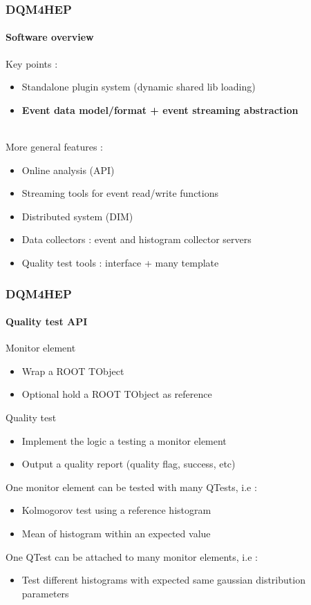\documentclass[presentation, 10pt]{beamer}
\begin{document}
\begin{frame}
  \frametitle{DQM4HEP}
  \framesubtitle{Software overview}
  \footnotesize
  Key points : 
  \begin{itemize}
    \item Standalone plugin system (dynamic shared lib loading) 
    \item \textbf{Event data model/format + event streaming abstraction}
  \end{itemize}
  ~ \\
  More general features :
  \begin{itemize}
    \item Online analysis (API)
    \item Streaming tools for event read/write functions
    \item Distributed system (DIM)
    \item Data collectors : event and histogram collector servers
    \item Quality test tools : interface + many template
  \end{itemize}
\end{frame}


\begin{frame}
  \frametitle{DQM4HEP}
  \framesubtitle{Quality test API}
  \footnotesize
  \begin{block}{Monitor element}
    \begin{itemize}
      \item Wrap a ROOT TObject 
      \item Optional hold a ROOT TObject as reference
    \end{itemize}
  \end{block}
  \begin{block}{Quality test}
    \begin{itemize}
      \item Implement the logic a testing a monitor element
      \item Output a quality report (quality flag, success, etc)
    \end{itemize}
  \end{block}
  One monitor element can be tested with many QTests, i.e : \\
  \begin{itemize}
    \item Kolmogorov test using a reference histogram
    \item Mean of histogram within an expected value
  \end{itemize}
  One QTest can be attached to many monitor elements, i.e :
  \begin{itemize}
    \item Test different histograms with expected same gaussian distribution parameters
  \end{itemize}
\end{frame}
\end{document}
